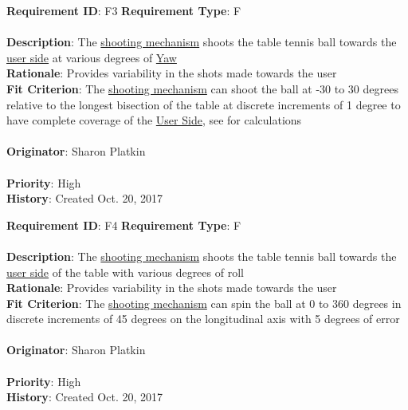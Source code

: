 \documentclass[11pt]{article}
\begin{document}
\begin{framed}
	\noindent\textbf{Requirement ID}: F3 \hfill \textbf{Requirement Type}: F \hfill\\\\
	\noindent\textbf{Description}: The \hyperref[sec:definitions]{shooting mechanism} shoots the table tennis ball towards the \hyperref[sec:definitions]{user side} at various degrees of \hyperref[sec:definitions]{Yaw} \\
	\textbf{Rationale}: Provides variability in the shots made towards the user \\
	\textbf{Fit Criterion}: The \hyperref[sec:definitions]{shooting mechanism} can shoot the ball at -30 to 30 degrees relative to the longest bisection of the table at discrete increments of 1 degree to have complete coverage of the \hyperref[sec:definitions]{User Side}, see  for calculations \\\\
	\textbf{Originator}: Sharon Platkin \\\\
	\textbf{Priority}: High \hfill \\
	\noindent\textbf{History}: Created Oct. 20, 2017
\end{framed}

\begin{framed}
	\noindent\textbf{Requirement ID}: F4 \hfill \textbf{Requirement Type}: F \hfill\\\\
	\noindent\textbf{Description}: The \hyperref[sec:definitions]{shooting mechanism} shoots the table tennis ball towards the \hyperref[sec:definitions]{user side} of the table with various degrees of roll \\
	\textbf{Rationale}: Provides variability in the shots made towards the user \\
	\textbf{Fit Criterion}: The \hyperref[sec:definitions]{shooting mechanism} can spin the ball at 0 to 360 degrees in discrete increments of 45 degrees on the longitudinal axis with 5 degrees of error\\\\ %
	\textbf{Originator}: Sharon Platkin \\\\
	\textbf{Priority}: High \hfill \\
	\noindent\textbf{History}: Created Oct. 20, 2017
\end{framed}
\end{document}
